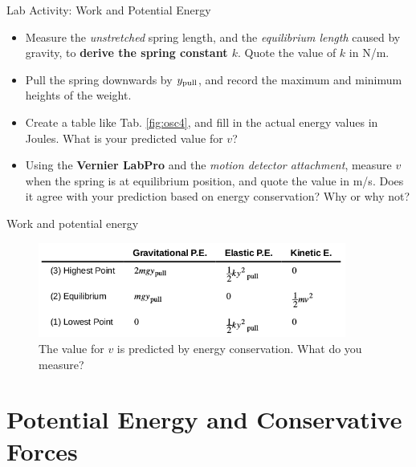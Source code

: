 \documentclass{beamer}
\begin{document}
\begin{frame}{Lab Activity: Work and Potential Energy}
\small
\begin{itemize}
\item Measure the \textit{unstretched} spring length, and the \textit{equilibrium length} caused by gravity, to \textbf{derive the spring constant $k$}.  Quote the value of $k$ in N/m.
\item Pull the spring downwards by $y_{\rm pull}$, and record the maximum and minimum heights of the weight.
\item Create a table like Tab. \ref{fig:osc4}, and fill in the actual energy values in Joules.  What is your predicted value for $v$?
\item Using the \textbf{Vernier LabPro} and the \textit{motion detector attachment}, measure $v$ when the spring is at equilibrium position, and quote the value in m/s.  Does it agree with your prediction based on energy conservation?  Why or why not?
\end{itemize}
\end{frame}

\begin{frame}{Work and potential energy}
\begin{figure}
\centering
\includegraphics[width=0.9\textwidth,trim=0cm 0.1cm 0cm 0cm,clip=true]{figures/table.png}
\caption{\label{fig:osc6} The value for $v$ is predicted by energy conservation.  What do you measure?}
\end{figure}
\end{frame}

\section{Potential Energy and Conservative Forces}
\end{document}
